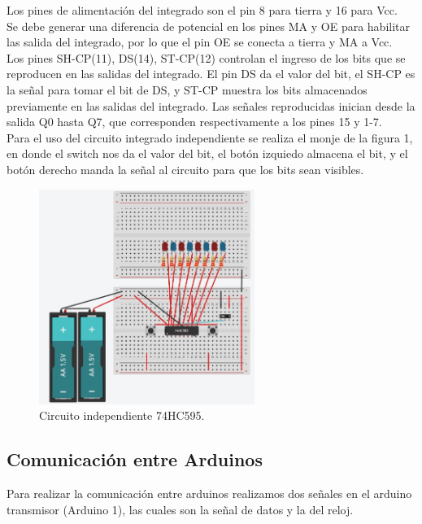 \documentclass{article}
\begin{document}
Los pines de alimentación del integrado son el pin 8 para tierra y 16 para Vcc.\\

Se debe generar una diferencia de potencial en los pines MA y OE para habilitar las salida del integrado, por lo que el pin OE se conecta a tierra y MA a Vcc.\\

Los pines SH-CP(11), DS(14), ST-CP(12) controlan el ingreso de los bits que se reproducen en las salidas del integrado. El pin DS da el valor del bit, el SH-CP es la señal para tomar el bit de DS, y ST-CP muestra los bits almacenados previamente en las salidas del integrado. Las señales reproducidas inician desde la salida Q0 hasta Q7, que corresponden respectivamente a los pines 15 y 1-7. \cite{youtube}\\

Para el uso del circuito integrado independiente se realiza el monje de la figura 1, en donde el switch nos da el valor del bit, el botón izquiedo almacena el bit, y el botón derecho manda la señal al circuito para que los bits sean visibles.

\begin{figure}[h]
\includegraphics[width=7cm]{74HC595.jpg}
\centering
\caption{Circuito independiente 74HC595.}
\label{fig:74HC595.jpg}
\end{figure}




\subsection{Comunicación entre Arduinos}
Para realizar la comunicación entre arduinos realizamos dos señales en el arduino transmisor (Arduino 1), las cuales son la señal de datos y la del reloj. \\
\end{document}

